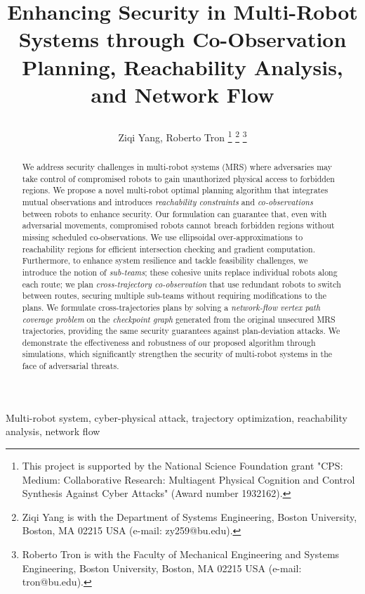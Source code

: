 \documentclass[10pt,twocolumn,twoside]{IEEEtran}
\title{\LARGE \bf

Enhancing Security in Multi-Robot Systems through Co-Observation Planning, Reachability Analysis, and Network Flow}
\author{Ziqi Yang, Roberto Tron \IEEEmembership{Member, IEEE} 
\thanks{This project is supported by the National Science Foundation grant "CPS: Medium: Collaborative Research: Multiagent Physical Cognition and Control Synthesis Against Cyber Attacks" (Award number 1932162).}
\thanks{Ziqi Yang is with the Department of Systems Engineering,
Boston University, Boston, MA 02215 USA (e-mail: zy259@bu.edu).
}
\thanks{Roberto Tron is with the Faculty of Mechanical Engineering and Systems Engineering, Boston University, Boston, MA 02215 USA (e-mail:
tron@bu.edu).}}
\begin{document}
\maketitle
\thispagestyle{empty}
\pagestyle{empty}




\begin{abstract}
We address security challenges in multi-robot systems (MRS) where adversaries may take control of compromised robots to gain unauthorized physical access to forbidden regions. We propose a novel multi-robot optimal planning algorithm that integrates mutual observations and introduces \emph{reachability constraints} and \emph{co-observations} between robots to enhance security. Our formulation can guarantee that, even with adversarial movements, compromised robots cannot breach forbidden regions without missing scheduled co-observations. We use ellipsoidal over-approximations to reachability regions for efficient intersection checking and gradient computation. Furthermore, to enhance system resilience and tackle feasibility challenges, we introduce the notion of \emph{sub-teams}; these cohesive units replace individual robots along each route; we plan \emph{cross-trajectory co-observation} that use redundant robots to switch between routes, securing multiple sub-teams without requiring modifications to the plans. We formulate cross-trajectories plans by solving a \emph{network-flow vertex path coverage problem} on the \emph{checkpoint graph} generated from the original unsecured MRS trajectories, providing the same security guarantees against plan-deviation attacks. We demonstrate the effectiveness and robustness of our proposed algorithm through simulations, which significantly strengthen the security of multi-robot systems in the face of adversarial threats.
\end{abstract}
\begin{IEEEkeywords}
  Multi-robot system, cyber-physical attack, trajectory optimization, reachability analysis, network flow
\end{IEEEkeywords}
\end{document}
